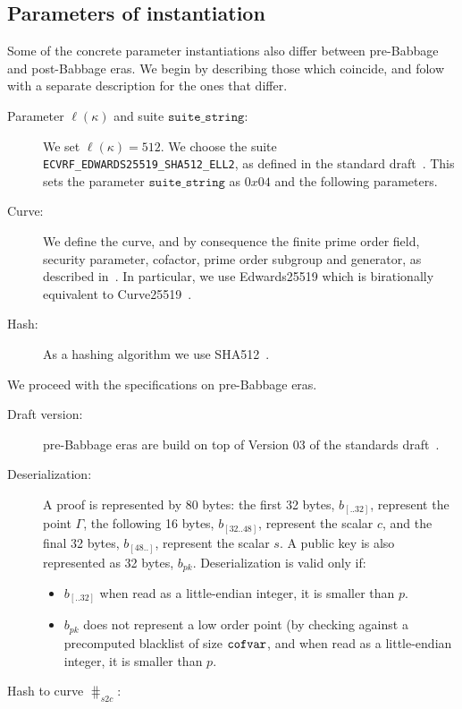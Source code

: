 \subsection{Parameters of instantiation}
Some of the concrete parameter instantiations also differ between pre-Babbage and post-Babbage eras. We begin by describing those which coincide, and folow with a separate description for the ones that differ.
\begin{description}
\item[Parameter $\ell(\kappa)$ and suite $\texttt{suite\_string}$:] We set $\ell(\kappa)=512$. We choose the suite \texttt{ECVRF\_EDWARDS25519\_SHA512\_ELL2}, as defined in the standard draft~\cite{vrfdraft}. This sets the parameter $\texttt{suite\_string}$ as $0x04$ and the following parameters.
\item[Curve:] We define the curve, and by consequence the finite prime order field, security parameter, cofactor, prime order subgroup and generator, as described in~\cite{CHES:BDLSY11}. In particular, we use Edwards25519 which is birationally equivalent to Curve25519~\cite{PKC:Bernstein06}.
\item[Hash:] As a hashing algorithm we use SHA512~\cite{FIPS1802}.
\end{description}

We proceed with the specifications on pre-Babbage eras.
\begin{description}
\item[Draft version:] pre-Babbage eras are build on top of Version 03 of the standards draft~\cite{vrfdraft}.
\item[Deserialization:] A \vrf proof is represented by 80 bytes: the first 32 bytes, $b_{[..32]}$, represent the point $\Gamma$, the following 16 bytes, $b_{[32..48]}$, represent the scalar $c$, and the final 32 bytes, $b_{[48..]}$, represent the scalar $s$. A public key is also represented as 32 bytes, $b_{pk}$. Deserialization is valid only if:
\begin{itemize}
\item $b_{[..32]}$ when read as a little-endian integer, it is smaller than $p$.
\item $b_{pk}$ does not represent a low order point (by checking against a precomputed blacklist of size $\texttt{cofvar}$, and when read as a little-endian integer, it is smaller than $p$.
\end{itemize}
\item[Hash to curve $\hash_{s2c}$:]
\end{description}

